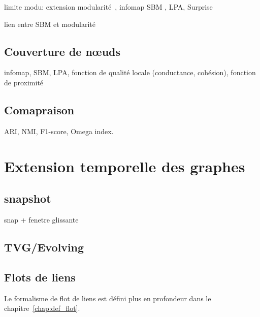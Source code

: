 limite modu: \cite{Fortunato2007} extension \cite{Reichardt2006, Delvenne2010}
modularité~\cite{Newman2004}, infomap SBM \cite{Holland1983a}, LPA, Surprise

lien entre SBM et modularité\cite{Newman2016}
\subsection{Couverture de n\oe uds}
\label{subsec:cover}
infomap, SBM, LPA, fonction de qualité locale (conductance, cohésion), fonction de proximité

\cite{Danisch2012, Kanawati2014, Xie2013}
\subsection{Comapraison}
ARI, NMI, F1-score, Omega index.


\section{Extension temporelle des graphes}
\label{sec:intro_extension_temporelle}
\subsection{snapshot}
snap + fenetre glissante
\subsection{TVG/Evolving}
\subsection{Flots de liens}
Le formalisme de flot de liens est défini plus en profondeur dans le chapitre~\ref{chap:def_flot}.
